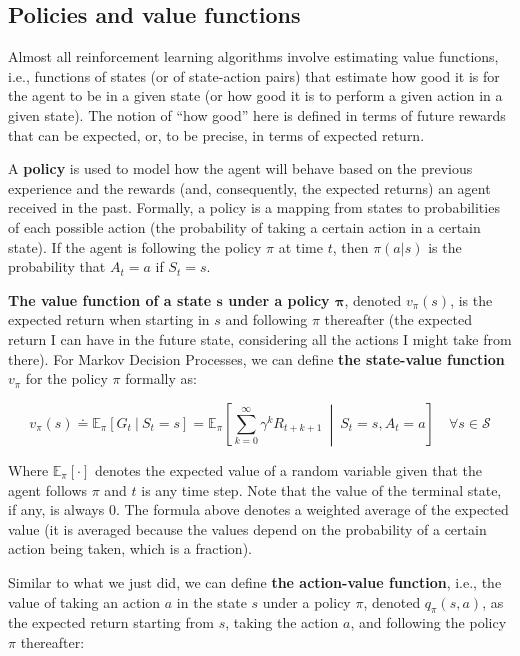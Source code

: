 \subsection{Policies and value functions}
Almost all reinforcement learning algorithms involve estimating value functions, i.e., functions of states (or of state-action pairs) that estimate how good it is for the agent to be in a given state (or how good it is to perform a given action in a given state). The notion of ``how good'' here is defined in terms of future rewards that can be expected, or, to be precise, in terms of expected return.

A \textbf{policy} is used to model how the agent will behave based on the previous experience and the rewards (and, consequently, the expected returns) an agent received in the past. Formally, a policy is a mapping from states to probabilities of each possible action (the probability of taking a certain action in a certain state). If the agent is following the policy $\pi$ at time $t$, then $\pi (a \vert s)$ is the probability that $A_t=a$ if $S_t=s$.

\textbf{The value function of a state $\boldsymbol{s}$ under a policy $\boldsymbol{\pi}$}, denoted $v_\pi (s)$, is the expected return when starting in $s$ and following $\pi$ thereafter (the expected return I can have in the future state, considering all the actions I might take from there). For Markov Decision Processes, we can define \textbf{the state-value function} $v_\pi$ for the policy $\pi$ formally as:

\begin{equation}
    v_\pi(s) \doteq \mathbb{E}_\pi \left[ G_t  \ \vert \  S_t = s \right] = \mathbb{E}_\pi \left[ \sum_{k=0}^{\infty}  \gamma^k R_{t+k+1} \  \middle\vert \  S_t = s, A_t = a \right] \quad \forall s \in \mathcal{S}
    \label{eq:ch2-statevaluefunction}
\end{equation}

Where $\mathbb{E}_\pi [\cdot]$ denotes the expected value of a random variable given that the agent follows $\pi$ and $t$ is any time step. Note that the value of the terminal state, if any, is always $0$. The formula above denotes a weighted average of the expected value (it is averaged because the values depend on the probability of a certain action being taken, which is a fraction).

Similar to what we just did, we can define \textbf{the action-value function}, i.e., the value of taking an action $a$ in the state $s$ under a policy $\pi$, denoted $q_\pi (s,a)$, as the expected return starting from $s$, taking the action $a$, and following the policy $\pi$ thereafter:

